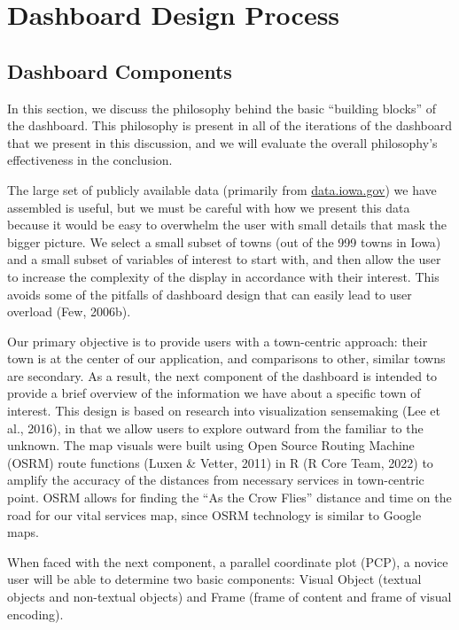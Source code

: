 \documentclass[print]{nuthesis}
\begin{document}
\hypertarget{dashboard-design-process}{%
\section{Dashboard Design Process}\label{dashboard-design-process}}

\hypertarget{dashboard-components}{%
\subsection{Dashboard Components}\label{dashboard-components}}

In this section, we discuss the philosophy behind the basic ``building blocks'' of the dashboard. This philosophy is present in all of the iterations of the dashboard that we present in this discussion, and we will evaluate the overall philosophy's effectiveness in the conclusion.

The large set of publicly available data (primarily from \url{data.iowa.gov}) we have assembled is useful, but we must be careful with how we present this data because it would be easy to overwhelm the user with small details that mask the bigger picture. We select a small subset of towns (out of the 999 towns in Iowa) and a small subset of variables of interest to start with, and then allow the user to increase the complexity of the display in accordance with their interest. This avoids some of the pitfalls of dashboard design that can easily lead to user overload (Few, 2006b).

Our primary objective is to provide users with a town-centric approach: their town is at the center of our application, and comparisons to other, similar towns are secondary. As a result, the next component of the dashboard is intended to provide a brief overview of the information we have about a specific town of interest. This design is based on research into visualization sensemaking (Lee et al., 2016), in that we allow users to explore outward from the familiar to the unknown. The map visuals were built using Open Source Routing Machine (OSRM) route functions (Luxen \& Vetter, 2011) in R (R Core Team, 2022) to amplify the accuracy of the distances from necessary services in town-centric point. OSRM allows for finding the ``As the Crow Flies'' distance and time on the road for our vital services map, since OSRM technology is similar to Google maps.

When faced with the next component, a parallel coordinate plot (PCP), a novice user will be able to determine two basic components: Visual Object (textual objects and non-textual objects) and Frame (frame of content and frame of visual encoding).
\end{document}
